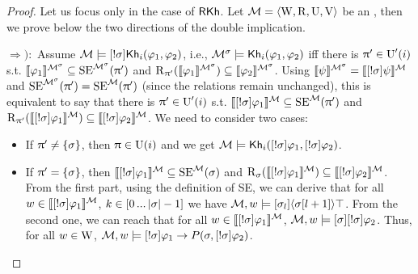 \begin{proof}

Let us focus only in the case of $\axm{RKh}$.  
Let $\modults = \tup{\W, \R, \Unc, \V}$ be an \ults, then we prove below the two directions of the double implication.

$\Rightarrow):$ Assume $\modults \models \srefbox{\plan} \khi(\varphi_1,\varphi_2)$, i.e.,  $\modults^\plan \models \khi(\varphi_1,\varphi_2)$ iff there is $\plans' \in \Unc'(i)$ s.t. $\truthset{\modults^\plan}{\varphi_1} \subseteq \stexec^{\modults^\plan}(\plans')$ and $\R_{\plans'}(\truthset{\modults^\plan}{\varphi_1}) \subseteq \truthset{\modults^\plan}{\varphi_2}$.
Using $\truthset{\modults^\plan}{\psi} = \truthset{\modults}{\srefbox{\plan} \psi}$ and $\stexec^{\modults^\plan}(\plans') = \stexec^\modults(\plans')$ (since the relations remain unchanged), this is equivalent to say that there is $\plans' \in \Unc'(i)$ s.t. $\truthset{\modults}{\srefbox{\plan} \varphi_1} \subseteq \stexec^\modults(\plans')$ and $\R_{\plans'}(\truthset{\modults}{\srefbox{\plan} \varphi_1}) \subseteq \truthset{\modults}{\srefbox{\plan} \varphi_2}$. We need to consider two cases:
\begin{itemize}
\item If $\plans' \neq \set{\plan}$, then $\plans \in \Unc(i)$ and we get $\modults \models \khi(\srefbox{\plan}\varphi_1,\srefbox{\plan}\varphi_2)$.
\item If $\plans' = \set{\plan}$, then $\truthset{\modults}{\srefbox{\plan}\varphi_1} \subseteq \stexec^\modults(\plan)$ and $\R_\plan(\truthset{\modults}{\srefbox{\plan}\varphi_1}) \subseteq \truthset{\modults}{\srefbox{\plan}\varphi_2}$.
From the first part, using the definition of SE, we can derive that for all $w \in \truthset{\modults}{\srefbox{\plan}\varphi_1}$, $k \in \intint{0}{\card{\plan}-1}$ we have $\modults,w \models \mlbox{\plan_l}\mldiam{\plan[l+1]}\top$.
From the second one, we can reach that for all $w \in \truthset{\modults}{\srefbox{\plan}\varphi_1}$, $\modults,w \models \mlbox{\plan} \srefbox{\plan}\varphi_2$.
Thus, for all $w \in \W$, $\modults,w \models \srefbox{\plan} \varphi_1 \ra P(\plan,\srefbox{\plan}\varphi_2)$.
\end{itemize}


\end{proof}
